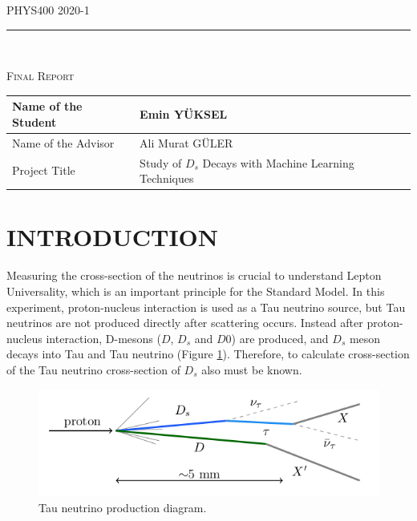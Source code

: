 \documentclass[12pt]{report}
\begin{document}
\begin{titlepage}
\centering
\vspace*{-4.0 cm}
\begin{center}    
\Large{PHYS400} \hfill \Large{2020-1}
\rule{\linewidth}{0.2 mm} \\[5.0 cm]
\end{center}
   	
\textsc{\Huge Final Report}\\[5.0 cm]				
	
\begin{center}
\begin{tabular}{|l|l|}
\hline
\Large{Name of the Student} & Emin YÜKSEL
\\ \hline
\Large{Name of the Advisor} & Ali Murat GÜLER
\\ \hline
\Large{Project Title}       & Study of $D_s$ Decays with Machine Learning Techniques 
\\ \hline
\end{tabular}
\end{center} 
\end{titlepage}

\tableofcontents
\pagebreak

\renewcommand{\thesection}{\arabic{section}}
\section{INTRODUCTION}

Measuring the cross-section of the neutrinos is crucial to understand Lepton Universality, which is an important principle for the Standard Model. In this experiment, proton-nucleus interaction is used as a Tau neutrino source, but Tau neutrinos are not produced directly after scattering occurs. Instead after proton-nucleus interaction, D-mesons ($D$, $D_s$ and $D0$) are produced, and $D_s$ meson decays into Tau and Tau neutrino (Figure \ref{fig:process}). Therefore, to calculate cross-section of the Tau neutrino cross-section of $D_s$ also must be known.~\cite{aoki_ariga_dmitrievsky_firu_forshaw_fukuda_gornushkin_guler_haiduc_2019}

\begin{figure}[htp]
\includegraphics[width=\linewidth]{dstauProcess.png}
\caption{Tau neutrino production diagram.~\cite[p.~4]{aoki_ariga_dmitrievsky_firu_forshaw_fukuda_gornushkin_guler_haiduc_2019}}
\label{fig:process}
\end{figure}
\end{document}
